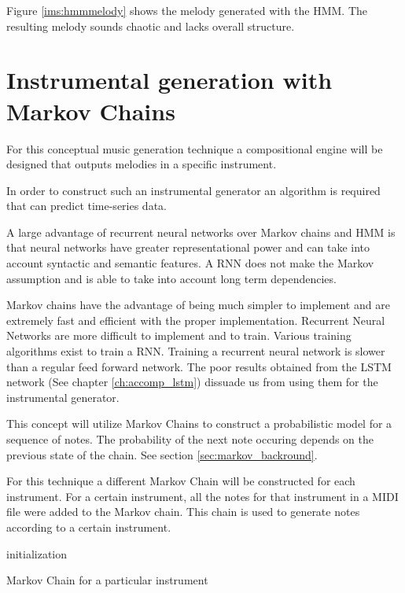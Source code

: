 Figure \ref{ims:hmmmelody} shows the melody generated with the \ac{HMM}. The resulting melody sounds chaotic and lacks overall structure.


\chapter{Instrumental generation with Markov Chains}
For this conceptual music generation technique a compositional engine will be designed that outputs melodies in a specific instrument. 

In order to construct such an instrumental generator an algorithm is required that can predict time-series data.

A large advantage of recurrent neural networks over Markov chains and \ac{HMM} is that neural networks have greater representational power and can take into account syntactic and semantic features. A \ac{RNN} does not make the Markov assumption and is able to take into account long term dependencies.

Markov chains have the advantage of being much simpler to implement and are extremely fast and efficient with the proper implementation. 
Recurrent Neural Networks are more difficult to implement and to train. Various training algorithms exist to train a \ac{RNN}. Training a recurrent neural network is slower than a regular feed forward network. The poor results obtained from the \ac{LSTM} network (See chapter \ref{ch:accomp_lstm}) dissuade us from using them for the instrumental generator.

This concept will utilize Markov Chains to construct a probabilistic model for a sequence of notes. The probability of the next note occuring depends on the previous state of the chain. See section \ref{sec:markov_backround}.

For this technique a different Markov Chain will be constructed for each instrument.
For a certain instrument, all the notes for that instrument in a MIDI file were added to the Markov chain. This chain is used to generate notes according to a certain instrument.
\begin{algorithm}
 initialization\;
 \caption{Markov Chain for a particular instrument}
\end{algorithm}

